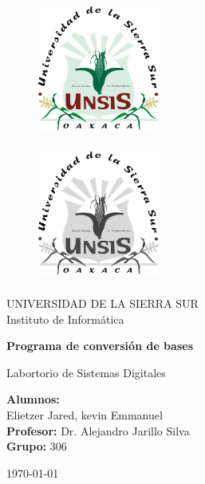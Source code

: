 \documentclass[letterpaper,12pt]{extarticle}%
\begin{document}
    \begin{titlepage}
		\begin{figure}[ht]
				\includegraphics[width=4cm]{imag//logColor.jpg}
				\label{escudoFI}
		   \endminipage

				\includegraphics[height = 4.5cm ,width=4cm]{imag//logBN.jpg} 
				\label{EscuoUNAM}
			\endminipage
		\end{figure}
		
		\vspace{0.5cm}
		
		\begin{center}
			\LARGE UNIVERSIDAD DE LA SIERRA SUR \\
			\vspace{0.3cm}
			\LARGE Instituto de Informática
			
			\vspace{.7cm} {\LARGE  \textbf{Programa de conversión de bases} \\}

			\vspace{.7cm} {\LARGE Labortorio de Sistemas Digitales}

			\vspace{.5cm}
			\begin{center}

				\LARGE{ \textbf{Alumnos:}}\\%
        \LARGE{Elietzer Jared, kevin Emmanuel}\\%
				\vspace{0.5cm}
				\textbf{Profesor:}  Dr. Alejandro Jarillo Silva \\
				\vspace{0.5cm}
				\textbf{Grupo:}  306
				
			\end{center}
			
			\vspace{1cm} \today
		\end{center}
\end{titlepage}
\end{document}
